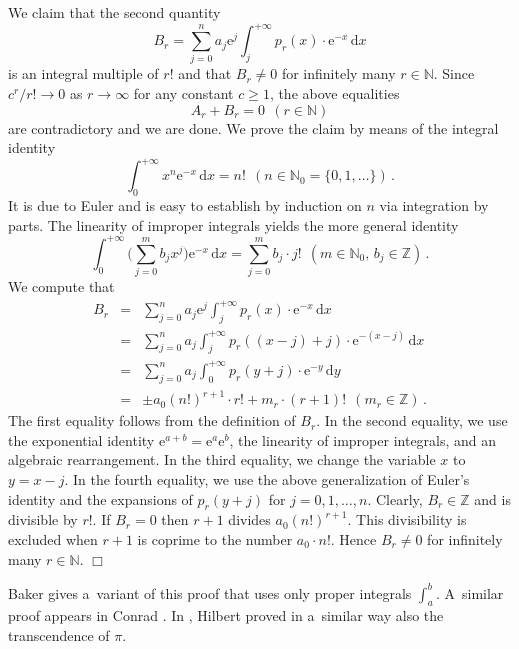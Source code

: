 \documentclass[10pt]{article}
\def\N{\mathbb{N}}
\def\Z{\mathbb{Z}}
\def\eproof{\hfill{$\Box$}\bigskip}
\def\ds{\dots}
\begin{document}
We claim that the second quantity
$$
{\textstyle
B_r=\sum_{j=0}^n
a_j\mathrm{e}^j\int_j^{+\infty}
p_r(x)\cdot\mathrm{e}^{-x}\,\mathrm{d}x
}
$$
is an integral multiple of $r!$ and that $B_r\ne0$ 
for infinitely many $r\in\N$. Since $c^r/r!\to0$ as $r\to\infty$ for any 
constant $c\ge1$, the above equalities
$$
A_r+B_r=0\ \ (r\in\N)
$$
are contradictory and we are done. We prove the claim by means of the integral identity  
$${\textstyle
\int_0^{+\infty}x^n\mathrm{e}^{-x}\,\mathrm{d}x=n!\ \ 
(n\in\N_0=\{0,1,\ds\})\,.
}
$$ 
It is due to Euler and is easy to 
establish by induction on $n$ via integration by parts. The linearity of improper integrals yields the more general identity 
$$
{\textstyle
\int_0^{+\infty}\big(\sum_{j=0}^m b_jx^j\big)\mathrm{e}^{-x}\,\mathrm{d}x=\sum_{j=0}^m b_j\cdot j!\ \ 
(m\in\N_0,\,b_j\in\Z)\,.
}
$$
We compute that
\begin{eqnarray*}
B_r&=&{\textstyle
\sum_{j=0}^n
a_j\mathrm{e}^j\int_j^{+\infty}
p_r(x)\cdot\mathrm{e}^{-x}\,\mathrm{d}x
}\\
&=&{\textstyle
\sum_{j=0}^n
a_j\int_j^{+\infty}
p_r((x-j)+j)\cdot\mathrm{e}^{-(x-j)}\,\mathrm{d}x
}\\
&=&{\textstyle
\sum_{j=0}^n
a_j\int_0^{+\infty}
p_r(y+j)\cdot\mathrm{e}^{-y}\,\mathrm{d}y}\\
&=&\pm a_0(n!)^{r+1}\cdot r!+m_r\cdot(r+1)!\ \ (m_r\in\Z)\,.
\end{eqnarray*}
The first equality follows from the definition of $B_r$.
In the second equality, we use the exponential identity 
$\mathrm{e}^{a+b}=\mathrm{e}^a\mathrm{e}^b$, the linearity of improper integrals, and an algebraic rearrangement. In the third 
equality, we change the variable $x$ to $y=x-j$.  
In the fourth equality, we use the above generalization of Euler's identity and
the expansions of $p_r(y+j)$ for $j=0,1,\ds,n$. Clearly,  
$B_r\in\Z$ and is divisible by $r!$. If $B_r=0$ then 
$r+1$ divides $a_0(n!)^{r+1}$. This divisibility is excluded when $r+1$ is 
coprime to the number $a_0\cdot n!$. Hence $B_r\ne0$ for infinitely many 
$r\in\N$. 
\eproof

\noindent
Baker \cite[Theorem~1.2]{bake} 
gives a~variant of this proof that uses only proper integrals 
$\int_a^b$. A~similar proof appears in Conrad \cite{conr}. In \cite{hilb}, Hilbert proved in a~similar way also the 
transcendence of $\pi$.
\end{document}
